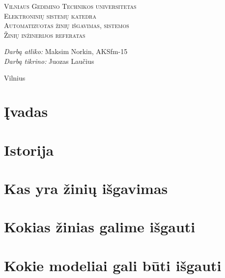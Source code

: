 \documentclass[11pt,a4paper]{article}
\begin{document}
\begin{titlepage}
  
  \begin{center}
    \textsc{\LARGE Vilniaus Gedimino Technikos universitetas}\\[2mm]
    \textsc{\Large Elektroninių sistemų katedra}\\[70mm]
    \textsc{\Large Automatizuotas žinių išgavimas, sistemos}\\[10mm]
    \textsc{\normalsize Žinių inžinerijos referatas}\\[40mm]
    \begin{minipage}{1\textwidth}
      \begin{flushright}
        \emph{Darbą atliko:} Maksim Norkin, AKSfm-15\\
        \emph{Darbą tikrino:} Juozas Laučius\\
      \end{flushright}
    \end{minipage}
    \vfill
    {\large Vilnius \\ \the\year}
  \end{center}
\end{titlepage}
\tableofcontents
\newpage

\section{Įvadas}



\section{Istorija}



\section{Kas yra žinių išgavimas}



\section{Kokias žinias galime išgauti}



\section{Kokie modeliai gali būti išgauti}
\end{document}

